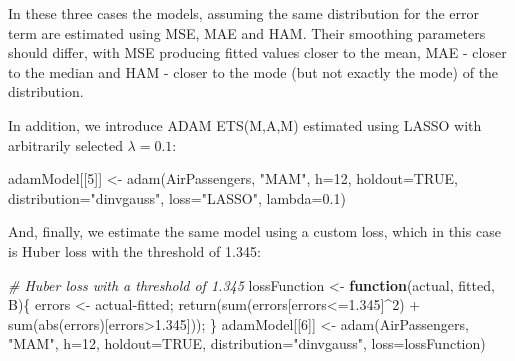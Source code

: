 \documentclass[
]{book}
\newenvironment{Shaded}{\begin{snugshade}}{\end{snugshade}}
\newcommand{\AttributeTok}[1]{\textcolor[rgb]{0.77,0.63,0.00}{#1}}
\newcommand{\CommentTok}[1]{\textcolor[rgb]{0.56,0.35,0.01}{\textit{#1}}}
\newcommand{\ConstantTok}[1]{\textcolor[rgb]{0.00,0.00,0.00}{#1}}
\newcommand{\ControlFlowTok}[1]{\textcolor[rgb]{0.13,0.29,0.53}{\textbf{#1}}}
\newcommand{\DecValTok}[1]{\textcolor[rgb]{0.00,0.00,0.81}{#1}}
\newcommand{\FloatTok}[1]{\textcolor[rgb]{0.00,0.00,0.81}{#1}}
\newcommand{\FunctionTok}[1]{\textcolor[rgb]{0.00,0.00,0.00}{#1}}
\newcommand{\NormalTok}[1]{#1}
\newcommand{\OtherTok}[1]{\textcolor[rgb]{0.56,0.35,0.01}{#1}}
\newcommand{\SpecialCharTok}[1]{\textcolor[rgb]{0.00,0.00,0.00}{#1}}
\newcommand{\StringTok}[1]{\textcolor[rgb]{0.31,0.60,0.02}{#1}}
\theoremstyle{definition}
\theoremstyle{definition}
\theoremstyle{definition}
\theoremstyle{definition}
\theoremstyle{remark}
\begin{document}
In these three cases the models, assuming the same distribution for the error term are estimated using MSE, MAE and HAM. Their smoothing parameters should differ, with MSE producing fitted values closer to the mean, MAE - closer to the median and HAM - closer to the mode (but not exactly the mode) of the distribution.

In addition, we introduce ADAM ETS(M,A,M) estimated using LASSO with arbitrarily selected \(\lambda=0.1\):

\begin{Shaded}
\begin{Highlighting}[]
\NormalTok{adamModel[[}\DecValTok{5}\NormalTok{]] }\OtherTok{\textless{}{-}} \FunctionTok{adam}\NormalTok{(AirPassengers, }\StringTok{"MAM"}\NormalTok{, }\AttributeTok{h=}\DecValTok{12}\NormalTok{, }\AttributeTok{holdout=}\ConstantTok{TRUE}\NormalTok{,}
                       \AttributeTok{distribution=}\StringTok{"dinvgauss"}\NormalTok{,}
                       \AttributeTok{loss=}\StringTok{"LASSO"}\NormalTok{, }\AttributeTok{lambda=}\FloatTok{0.1}\NormalTok{)}
\end{Highlighting}
\end{Shaded}

And, finally, we estimate the same model using a custom loss, which in this case is Huber loss with the threshold of 1.345:

\begin{Shaded}
\begin{Highlighting}[]
\CommentTok{\# Huber loss with a threshold of 1.345}
\NormalTok{lossFunction }\OtherTok{\textless{}{-}} \ControlFlowTok{function}\NormalTok{(actual, fitted, B)\{}
\NormalTok{  errors }\OtherTok{\textless{}{-}}\NormalTok{ actual}\SpecialCharTok{{-}}\NormalTok{fitted;}
  \FunctionTok{return}\NormalTok{(}\FunctionTok{sum}\NormalTok{(errors[errors}\SpecialCharTok{\textless{}=}\FloatTok{1.345}\NormalTok{]}\SpecialCharTok{\^{}}\DecValTok{2}\NormalTok{) }\SpecialCharTok{+} \FunctionTok{sum}\NormalTok{(}\FunctionTok{abs}\NormalTok{(errors)[errors}\SpecialCharTok{\textgreater{}}\FloatTok{1.345}\NormalTok{]));}
\NormalTok{\}}
\NormalTok{adamModel[[}\DecValTok{6}\NormalTok{]] }\OtherTok{\textless{}{-}} \FunctionTok{adam}\NormalTok{(AirPassengers, }\StringTok{"MAM"}\NormalTok{, }\AttributeTok{h=}\DecValTok{12}\NormalTok{, }\AttributeTok{holdout=}\ConstantTok{TRUE}\NormalTok{,}
                       \AttributeTok{distribution=}\StringTok{"dinvgauss"}\NormalTok{,}
                       \AttributeTok{loss=}\NormalTok{lossFunction)}
\end{Highlighting}
\end{Shaded}
\end{document}

